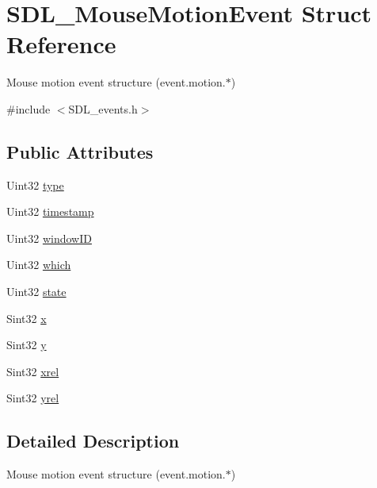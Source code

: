 \hypertarget{struct_s_d_l___mouse_motion_event}{}\section{S\+D\+L\+\_\+\+Mouse\+Motion\+Event Struct Reference}
\label{struct_s_d_l___mouse_motion_event}


Mouse motion event structure (event.\+motion.$\ast$)  




{\ttfamily \#include $<$S\+D\+L\+\_\+events.\+h$>$}

\subsection*{Public Attributes}
\begin{DoxyCompactItemize}
\item 
Uint32 \mbox{\hyperlink{struct_s_d_l___mouse_motion_event_a431dd28cd6db6a7335cf633dbeb80cfb}{type}}
\item 
Uint32 \mbox{\hyperlink{struct_s_d_l___mouse_motion_event_af530bc0ef327ea6d497c5b1da119841c}{timestamp}}
\item 
Uint32 \mbox{\hyperlink{struct_s_d_l___mouse_motion_event_aa9976725242ada93a9e18e7fdf5796e6}{window\+ID}}
\item 
Uint32 \mbox{\hyperlink{struct_s_d_l___mouse_motion_event_a6f04c17b4305683915e2fd2dc3c36dbc}{which}}
\item 
Uint32 \mbox{\hyperlink{struct_s_d_l___mouse_motion_event_a3f6e9bad9d959b824881ba09e05b7024}{state}}
\item 
Sint32 \mbox{\hyperlink{struct_s_d_l___mouse_motion_event_a36398bb4a5308446a262b0bfc8baa80a}{x}}
\item 
Sint32 \mbox{\hyperlink{struct_s_d_l___mouse_motion_event_a7e6a7b1f8713d1968dc913908e8ea448}{y}}
\item 
Sint32 \mbox{\hyperlink{struct_s_d_l___mouse_motion_event_a1c01d9aba2a20778fb45a15dca39ef58}{xrel}}
\item 
Sint32 \mbox{\hyperlink{struct_s_d_l___mouse_motion_event_a7674c8b92d039ab948f671a180fa7b30}{yrel}}
\end{DoxyCompactItemize}


\subsection{Detailed Description}
Mouse motion event structure (event.\+motion.$\ast$) 

